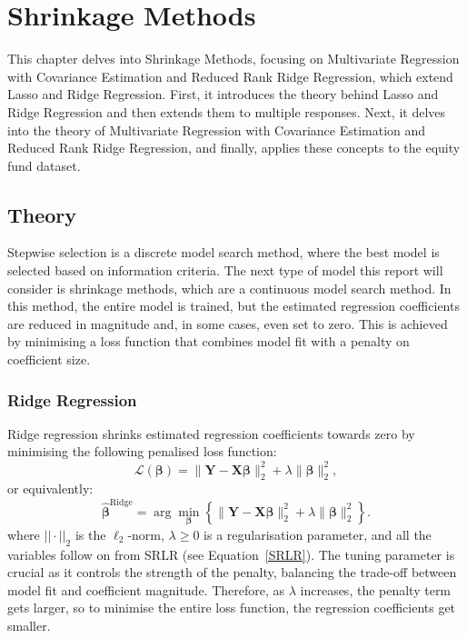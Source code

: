 \documentclass[11pt]{report} %
\begin{document}
\chapter{Shrinkage Methods}
\label{C4}
This chapter delves into Shrinkage Methods, focusing on Multivariate Regression with Covariance Estimation and Reduced Rank Ridge Regression, which extend Lasso and Ridge Regression. First, it introduces the theory behind Lasso and Ridge Regression and then extends them to multiple responses. Next, it delves into the theory of Multivariate Regression with Covariance Estimation and Reduced Rank Ridge Regression, and finally, applies these concepts to the equity fund dataset.

\section{Theory}
Stepwise selection is a discrete model search method, where the best model is selected based on information criteria. The next type of model this report will consider is shrinkage methods, which are a continuous model search method. In this method, the entire model is trained, but the estimated regression coefficients are reduced in magnitude and, in some cases, even set to zero. This is achieved by minimising a loss function that combines model fit with a penalty on coefficient size.

\subsection{Ridge Regression}
Ridge regression shrinks estimated regression coefficients towards zero by minimising the following penalised loss function:
\begin{equation*}
\mathcal{L}(\boldsymbol{\beta}) = \| \mathbf{Y} - \mathbf{X} \boldsymbol{\beta} \|_2^2 + \lambda \| \boldsymbol{\beta} \|_2^2,
\end{equation*}
\noindent or equivalently:
\begin{equation}
\hat{\boldsymbol{\beta}}^{\text{Ridge}} = \arg\min_{\boldsymbol{\beta}} \left\{ \|\mathbf{Y} - \mathbf{X}\boldsymbol{\beta}\|_2^2 + \lambda \|\boldsymbol{\beta}\|_2^2 \right\}.
\label{ridge-eqn}
\end{equation}
where $||\cdot||_2$ is the $\ell_2$-norm, \( \lambda \geq 0 \) is a regularisation parameter, and all the variables follow on from SRLR (see Equation~\ref{SRLR}). The tuning parameter is crucial as it controls the strength of the penalty, balancing the trade-off between model fit and coefficient magnitude. Therefore, as $\lambda$ increases, the penalty term gets larger, so to minimise the entire loss function, the regression coefficients get smaller. 
\end{document}

